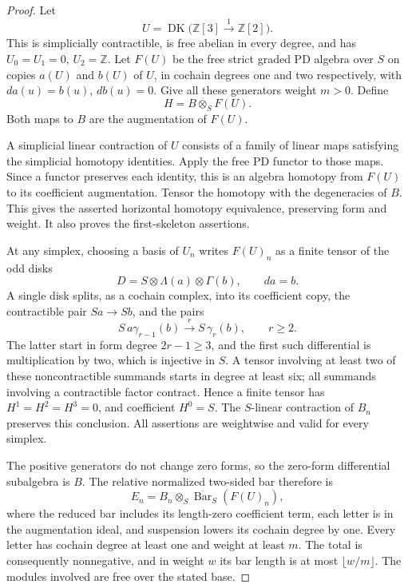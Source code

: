 \begin{proof}
Let
\[
 U=\operatorname{DK}\bigl(\mathbb Z[3]\xrightarrow{1}\mathbb Z[2]\bigr).
\]
This is simplicially contractible, is free abelian in every degree, and
has \(U_0=U_1=0\), \(U_2=\mathbb Z\).
Let \(F(U)\) be the free strict graded PD algebra over \(S\) on copies
\(a(U)\) and \(b(U)\) of \(U\), in cochain degrees one and two respectively,
with \(da(u)=b(u)\), \(db(u)=0\). Give all these generators weight \(m>0\).
Define
\[
                       H=B\otimes_S F(U).
\]
Both maps to \(B\) are the augmentation of \(F(U)\).

A simplicial linear contraction of \(U\) consists of a family of linear
maps satisfying the simplicial homotopy identities. Apply the free PD
functor to those maps. Since a functor preserves each identity, this is
an algebra homotopy from \(F(U)\) to its coefficient augmentation.
Tensor the homotopy with the degeneracies of \(B\). This gives the
asserted horizontal homotopy equivalence, preserving form and weight.
It also proves the first-skeleton assertions.

At any simplex, choosing a basis of \(U_n\) writes \(F(U)_n\) as a finite
tensor of the odd disks
\[
 D=S\otimes\Lambda(a)\otimes\Gamma(b),\qquad da=b.
\]
A single disk splits, as a cochain complex, into its coefficient copy,
the contractible pair \(Sa\to Sb\), and the pairs
\[
 S\,a\gamma_{r-1}(b)\xrightarrow{r}S\,\gamma_r(b),
                       \qquad r\geq2.
\]
The latter start in form degree \(2r-1\geq3\), and the first such
differential is multiplication by two, which is injective in \(S\).
A tensor involving at least two of these noncontractible summands starts
in degree at least six; all summands involving a contractible factor
contract. Hence a finite tensor has \(H^1=H^2=H^3=0\), and coefficient
\(H^0=S\). The \(S\)-linear contraction of \(B_n\) preserves this conclusion.
All assertions are weightwise and valid for every simplex.

The positive generators do not change zero forms, so the zero-form
differential subalgebra is \(B\). The relative normalized two-sided bar
therefore is
\[
 E_n=B_n\otimes_S\overline{\operatorname{Bar}}_S(F(U)_n),
\]
where the reduced bar includes its length-zero coefficient term, each
letter is in the augmentation ideal, and suspension lowers its cochain
degree by one. Every letter has cochain degree at least one and weight
at least \(m\). The total is consequently nonnegative, and in weight
\(w\) its bar length is at most \(\lfloor w/m\rfloor\).
The modules involved are free over the stated base.


\end{proof}
